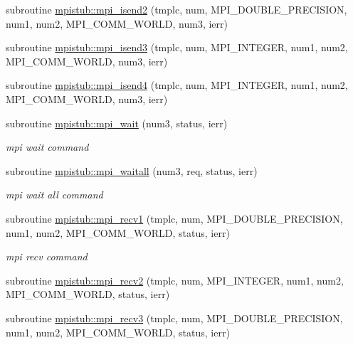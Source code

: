 \begin{DoxyCompactItemize}
subroutine \mbox{\hyperlink{namespacempistub_ac35bd42a69c258e2cc6e8db36212b3aa}{mpistub\+::mpi\+\_\+isend2}} (tmplc, num, M\+P\+I\+\_\+\+D\+O\+U\+B\+L\+E\+\_\+\+P\+R\+E\+C\+I\+S\+I\+ON, num1, num2, M\+P\+I\+\_\+\+C\+O\+M\+M\+\_\+\+W\+O\+R\+LD, num3, ierr)
\item 
subroutine \mbox{\hyperlink{namespacempistub_a47d130d2122c960528cefcdd0295e596}{mpistub\+::mpi\+\_\+isend3}} (tmplc, num, M\+P\+I\+\_\+\+I\+N\+T\+E\+G\+ER, num1, num2, M\+P\+I\+\_\+\+C\+O\+M\+M\+\_\+\+W\+O\+R\+LD, num3, ierr)
\item 
subroutine \mbox{\hyperlink{namespacempistub_a4afba16e08f9475afade41e36b28333c}{mpistub\+::mpi\+\_\+isend4}} (tmplc, num, M\+P\+I\+\_\+\+I\+N\+T\+E\+G\+ER, num1, num2, M\+P\+I\+\_\+\+C\+O\+M\+M\+\_\+\+W\+O\+R\+LD, num3, ierr)
\item 
subroutine \mbox{\hyperlink{namespacempistub_abc6e6b54dd8f86227143dffe19e34fa4}{mpistub\+::mpi\+\_\+wait}} (num3, status, ierr)
\begin{DoxyCompactList}\small\item\em mpi wait command \end{DoxyCompactList}\item 
subroutine \mbox{\hyperlink{namespacempistub_ae67c78bda40eb1d1e4dbd6c69afc6201}{mpistub\+::mpi\+\_\+waitall}} (num3, req, status, ierr)
\begin{DoxyCompactList}\small\item\em mpi wait all command \end{DoxyCompactList}\item 
subroutine \mbox{\hyperlink{namespacempistub_a43bcd6e1779da1802197e44427742c2b}{mpistub\+::mpi\+\_\+recv1}} (tmplc, num, M\+P\+I\+\_\+\+D\+O\+U\+B\+L\+E\+\_\+\+P\+R\+E\+C\+I\+S\+I\+ON, num1, num2, M\+P\+I\+\_\+\+C\+O\+M\+M\+\_\+\+W\+O\+R\+LD, status, ierr)
\begin{DoxyCompactList}\small\item\em mpi recv command \end{DoxyCompactList}\item 
subroutine \mbox{\hyperlink{namespacempistub_a9936e4610ebb0c4c17e99d8a6d39e562}{mpistub\+::mpi\+\_\+recv2}} (tmplc, num, M\+P\+I\+\_\+\+I\+N\+T\+E\+G\+ER, num1, num2, M\+P\+I\+\_\+\+C\+O\+M\+M\+\_\+\+W\+O\+R\+LD, status, ierr)
\item 
subroutine \mbox{\hyperlink{namespacempistub_a86129a6bb6e924778df9e0c578f838d2}{mpistub\+::mpi\+\_\+recv3}} (tmplc, num, M\+P\+I\+\_\+\+D\+O\+U\+B\+L\+E\+\_\+\+P\+R\+E\+C\+I\+S\+I\+ON, num1, num2, M\+P\+I\+\_\+\+C\+O\+M\+M\+\_\+\+W\+O\+R\+LD, status, ierr)

\end{DoxyCompactItemize}
